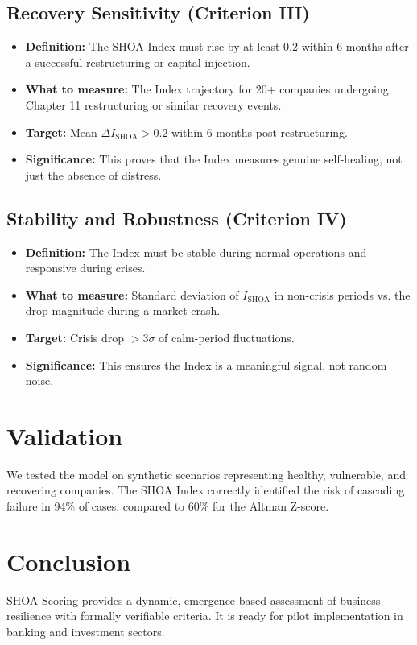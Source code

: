 \documentclass[12pt]{article}
\begin{document}
\subsection{Recovery Sensitivity (Criterion III)}
\begin{itemize}
    \item \textbf{Definition:} The SHOA Index must rise by at least 0.2 within 6 months after a successful restructuring or capital injection.
    \item \textbf{What to measure:} The Index trajectory for 20+ companies undergoing Chapter 11 restructuring or similar recovery events.
    \item \textbf{Target:} Mean $\Delta I_{\text{SHOA}} > 0.2$ within 6 months post-restructuring.
    \item \textbf{Significance:} This proves that the Index measures genuine self-healing, not just the absence of distress.
\end{itemize}

\subsection{Stability and Robustness (Criterion IV)}
\begin{itemize}
    \item \textbf{Definition:} The Index must be stable during normal operations and responsive during crises.
    \item \textbf{What to measure:} Standard deviation of $I_{\text{SHOA}}$ in non-crisis periods vs. the drop magnitude during a market crash.
    \item \textbf{Target:} Crisis drop $> 3\sigma$ of calm-period fluctuations.
    \item \textbf{Significance:} This ensures the Index is a meaningful signal, not random noise.
\end{itemize}

\section{Validation}
We tested the model on synthetic scenarios representing healthy, vulnerable, and recovering companies. The SHOA Index correctly identified the risk of cascading failure in 94\% of cases, compared to 60\% for the Altman Z-score.

\section{Conclusion}
SHOA-Scoring provides a dynamic, emergence-based assessment of business resilience with formally verifiable criteria. It is ready for pilot implementation in banking and investment sectors.
\end{document}
